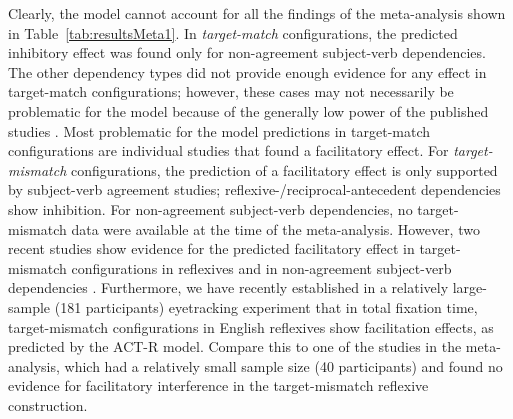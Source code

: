 \documentclass{cambridge7A}\usepackage[]{graphicx}\usepackage[]{color}
\begin{document}
Clearly, the model cannot account for all the findings of the meta-analysis shown in Table~\ref{tab:resultsMeta1}. 
In \emph{target-match} configurations, the predicted inhibitory effect was found only for non-agreement subject-verb dependencies. The other dependency types did not provide enough evidence for any effect in target-match configurations; however, these cases may not necessarily be problematic for the model because of the generally low power of the published studies  \citep[see][for discussion]{NicenboimEtAlCogSci2018,JaegerEngelmannVasishth2017,VasishthMertzenJaegerGelman2018,JaegerMertzenVanDykeVasishth2019}. 
Most problematic for the model predictions in target-match configurations are individual studies that found a facilitatory effect. 
For \emph{target-mismatch} configurations, the prediction of a facilitatory effect is only supported by subject-verb agreement studies; reflexive-/reciprocal-antecedent dependencies show inhibition. For non-agreement subject-verb dependencies, no target-mismatch data were available at the time of the meta-analysis. However, two recent studies show evidence for the predicted facilitatory effect in target-mismatch configurations in reflexives \citep{parker2017reflexive} and in non-agreement subject-verb dependencies \citep{CunningsSturt2018}. Furthermore, we have recently established in a relatively large-sample (181 participants) eyetracking experiment \citep{JaegerMertzenVanDykeVasishth2019} that in total fixation time, target-mismatch configurations in English reflexives show facilitation effects, as predicted by the ACT-R model. Compare this to one of the studies \citep{DillonMishlerSloggett2013} in the meta-analysis, which had a relatively small sample size (40 participants) and found no evidence for facilitatory interference in the target-mismatch reflexive construction.
\end{document}
